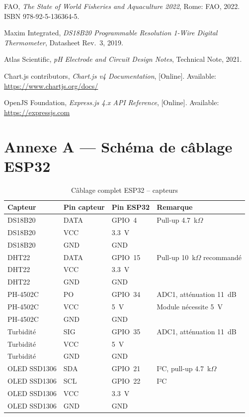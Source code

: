 \documentclass[12pt,a4paper]{report}
\begin{document}
\begin{thebibliography}{99}
FAO,
\textit{The State of World Fisheries and Aquaculture 2022},
Rome: FAO, 2022. ISBN 978-92-5-136364-5.

Maxim Integrated,
\textit{DS18B20 Programmable Resolution 1-Wire Digital Thermometer},
Datasheet Rev.~3, 2019.

Atlas Scientific,
\textit{pH Electrode and Circuit Design Notes},
Technical Note, 2021.

Chart.js contributors,
\textit{Chart.js v4 Documentation},
[Online]. Available: \url{https://www.chartjs.org/docs/}

OpenJS Foundation,
\textit{Express.js 4.x API Reference},
[Online]. Available: \url{https://expressjs.com}

\end{thebibliography}

\appendix
\chapter{Annexe A --- Schéma de câblage ESP32}

\begin{table}[H]
\centering
\caption{Câblage complet ESP32 -- capteurs}
\label{tab:wiring}
\begin{tabularx}{\textwidth}{@{}L{4cm}L{3cm}L{3cm}L{4cm}@{}}
\toprule
\textbf{Capteur} & \textbf{Pin capteur} & \textbf{Pin ESP32} & \textbf{Remarque} \\
\midrule
DS18B20 & DATA & GPIO~4  & Pull-up 4.7~k$\Omega$ \\
DS18B20 & VCC  & 3.3~V   & \\
DS18B20 & GND  & GND     & \\
\addlinespace
DHT22   & DATA & GPIO~15 & Pull-up 10~k$\Omega$ recommandé \\
DHT22   & VCC  & 3.3~V   & \\
DHT22   & GND  & GND     & \\
\addlinespace
PH-4502C & PO  & GPIO~34 & ADC1, atténuation 11~dB \\
PH-4502C & VCC & 5~V     & Module nécessite 5~V \\
PH-4502C & GND & GND     & \\
\addlinespace
Turbidité & SIG & GPIO~35 & ADC1, atténuation 11~dB \\
Turbidité & VCC & 5~V     & \\
Turbidité & GND & GND     & \\
\addlinespace
OLED SSD1306 & SDA & GPIO~21 & I²C, pull-up 4.7~k$\Omega$ \\
OLED SSD1306 & SCL & GPIO~22 & I²C \\
OLED SSD1306 & VCC & 3.3~V   & \\
OLED SSD1306 & GND & GND     & \\
\bottomrule
\end{tabularx}
\end{table}
\end{document}
